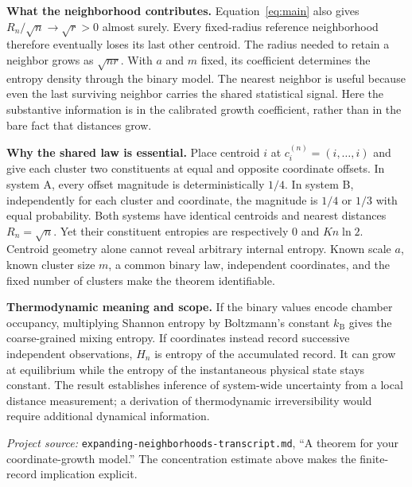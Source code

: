 \documentclass[11pt,letterpaper]{article}
\begin{document}
\textbf{What the neighborhood contributes.}
Equation~\eqref{eq:main} also gives $R_n/\sqrt n\to\sqrt r>0$ almost surely.
Every fixed-radius reference neighborhood therefore eventually loses its
last other centroid. The radius needed to retain a neighbor grows as
$\sqrt{nr}$. With $a$ and $m$ fixed, its coefficient determines the entropy
density through the binary model. The nearest neighbor is useful because
even the last surviving neighbor carries the shared statistical signal.
Here the substantive information is in the calibrated growth coefficient,
rather than in the bare fact that distances grow.

\textbf{Why the shared law is essential.}
Place centroid $i$ at $c_i^{(n)}=(i,\ldots,i)$ and give each cluster two
constituents at equal and opposite coordinate offsets. In system A, every
offset magnitude is deterministically $1/4$. In system B, independently for
each cluster and coordinate, the magnitude is $1/4$ or $1/3$ with equal
probability. Both systems have identical centroids and nearest distances
$R_n=\sqrt n$. Yet their constituent entropies are respectively $0$ and
$Kn\ln2$. Centroid geometry alone cannot reveal arbitrary internal entropy.
Known scale $a$, known cluster size $m$, a common binary law, independent
coordinates, and the fixed number of clusters make the theorem identifiable.

\textbf{Thermodynamic meaning and scope.}
If the binary values encode chamber occupancy, multiplying Shannon entropy
by Boltzmann's constant $k_{\mathrm B}$ gives the coarse-grained mixing entropy.
If coordinates instead record successive independent observations,
$H_n$ is entropy of the accumulated record. It can grow at equilibrium
while the entropy of the instantaneous physical state stays constant.
The result establishes inference of system-wide uncertainty from a local
distance measurement; a derivation of thermodynamic irreversibility would
require additional dynamical information.

\vfill
{\footnotesize\textit{Project source:} \nolinkurl{expanding-neighborhoods-transcript.md},
``A theorem for your coordinate-growth model.'' The concentration estimate
above makes the finite-record implication explicit.}
\end{document}
